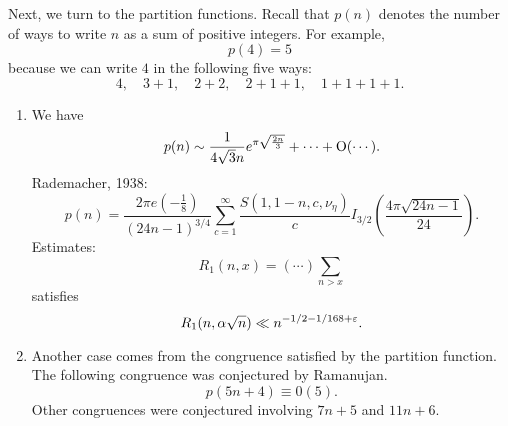 \documentclass[reqno]{amsart} 
\begin{document}
Next, we turn to the partition functions.  Recall that $p (n) $ denotes the number of ways to write $n$ as a sum of positive integers.  For example,
\begin{equation*}
  p(4) = 5
\end{equation*}
because we can write $4$ in the following five ways:
\begin{equation*}
  4, \quad
  3 + 1, \quad
  2 + 2, \quad
  2 + 1 + 1, \quad
  1 +1+1+1.
\end{equation*}
\begin{enumerate}
\item We have
  \begin{equation*}
    p (n) \sim \frac{1}{4 \sqrt{3} n} e^{\pi \sqrt{\frac{2 n}{3}}} + \dotsb + \operatorname{O}(\dotsb).
  \end{equation*}
  Rademacher, 1938:
  \begin{equation*}
    p(n) = \frac{2 \pi e (- \tfrac{1}{8})}{(24 n - 1)^{3/4}}
    \sum_{c = 1}^\infty
    \frac{S (1, 1 - n, c, \nu_\eta )}{c}
    I_{3/2} \left( \frac{4 \pi \sqrt{2 4 n - 1}}{24} \right).
  \end{equation*}
  Estimates:
  \begin{equation*}
    R_1 (n, x) = (\dotsb) \sum_{n > x}
  \end{equation*}
  satisfies
  \begin{equation*}
    R_1 (n, \alpha \sqrt{n})
    \ll n^{- 1/2 - 1/168 + \varepsilon }.
  \end{equation*}
  
\item Another case comes from the congruence satisfied by the partition function.  The following congruence was conjectured by Ramanujan.
  \begin{equation*}
    p (5 n + 4) \equiv 0(5).
  \end{equation*}
  Other congruences were conjectured involving $7 n + 5$ and $11 n + 6$.


\end{enumerate}
\end{document}
